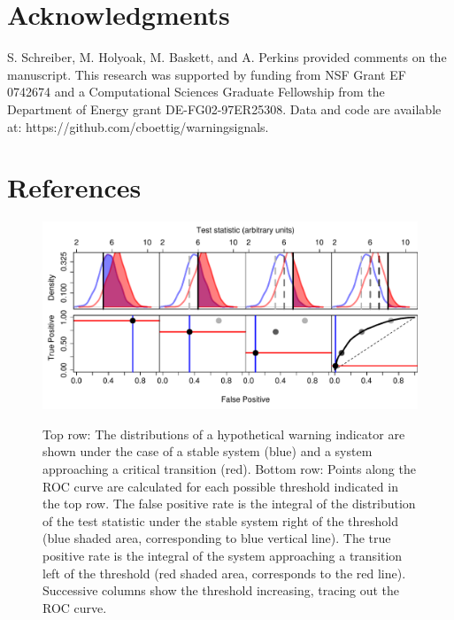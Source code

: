 \documentclass[authoryear,preprint,11pt]{elsarticle}
\begin{document}
\section{Acknowledgments}
S. Schreiber, M. Holyoak, M. Baskett, and A. Perkins provided comments on the manuscript.  This research was supported by funding from NSF Grant EF 0742674 and a Computational Sciences Graduate Fellowship from the Department of Energy grant DE-FG02-97ER25308. Data and code are available at: https://github.com/cboettig/warningsignals. 




 \section{References}%
 



\begin{figure}[hb]
   \begin{center}
     \includegraphics[width=\linewidth]{Fig1}
     \label{fig1}
     \caption{Top row: The distributions of a hypothetical warning indicator are shown under the case of a stable system (blue) and a system approaching a critical transition (red).  Bottom row: Points along the ROC curve are calculated for each possible threshold indicated in the top row.  The false positive rate is the integral of the distribution of the test statistic under the stable system right of the threshold (blue shaded area, corresponding to blue vertical line).  The true positive rate is the integral of the system approaching a transition left of the threshold (red shaded area, corresponds to the red line).  Successive columns show the threshold increasing, tracing out the ROC curve.}
  \end{center}
 \end{figure}
\end{document}
